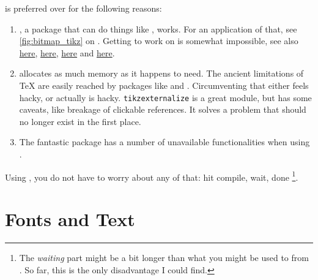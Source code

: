  is preferred over  for the following reasons:
\begin{enumerate}
    \item {}, a package that can do things like
        , works.
        For an application of that, see \cref{fig:bitmap_tikz} on
        .
        Getting  to work on  is somewhat impossible,
        see also
        \href{https://tex.stackexchange.com/questions/421970/contour-text-in-xelatex}{here},
        \href{https://tex.stackexchange.com/questions/354410/how-should-the-effects-of-manipulating-specials-be-switched-off}{here},
        \href{https://tex.stackexchange.com/questions/225637/how-to-add-outline-to-a-character-under-xelatex}{here} and
        \href{https://tex.stackexchange.com/questions/25221/outlined-characters}{here}.
    \item {} allocates as much memory as it happens to need.
        The ancient limitations of \TeX{} are easily reached by packages like
         and .
        Circumventing that either feels hacky, or actually is hacky.
        \texttt{tikzexternalize} is a great module, but has some caveats, like
        breakage of clickable references.
        It solves a problem that should no longer exist in the first place.
    \item The fantastic  package has a number of unavailable
        functionalities when using .
\end{enumerate}
Using , you do not have to worry about any of that:
hit compile, wait, done%
\footnote{
    The \emph{waiting} part might be a bit longer than what you might be used to
    from .
    So far, this is the only disadvantage I could find.
}.

\section{Fonts and Text}
\label{ch:fonts_text}

